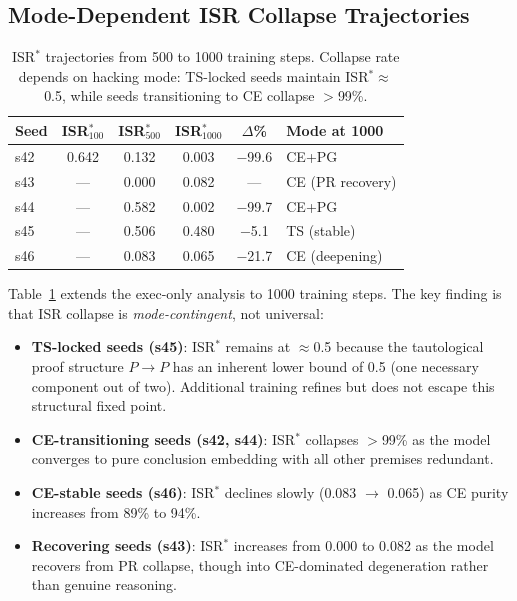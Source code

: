 \documentclass[11pt,a4paper]{article}
\newcommand{\isr}{\textsc{ISR}}
\begin{document}
\subsection{Mode-Dependent ISR Collapse Trajectories}
\label{sec:trajectory}

\begin{table}[t]
\centering
\small
\begin{tabular}{lccccl}
\toprule
Seed & \isr{}$^*_{100}$ & \isr{}$^*_{500}$ & \isr{}$^*_{1000}$ & $\Delta$\% & Mode at 1000 \\
\midrule
s42 & 0.642 & 0.132 & 0.003 & $-$99.6 & CE+PG \\
s43 & --- & 0.000 & 0.082 & --- & CE (PR recovery) \\
s44 & --- & 0.582 & 0.002 & $-$99.7 & CE+PG \\
s45 & --- & 0.506 & 0.480 & $-$5.1 & TS (stable) \\
s46 & --- & 0.083 & 0.065 & $-$21.7 & CE (deepening) \\
\bottomrule
\end{tabular}
\caption{\isr{}$^*$ trajectories from 500 to 1000 training steps. Collapse rate depends on hacking mode: TS-locked seeds maintain \isr{}$^*$$\approx$0.5, while seeds transitioning to CE collapse $>$99\%.}
\label{tab:trajectory}
\end{table}

Table~\ref{tab:trajectory} extends the exec-only analysis to 1000 training steps.
The key finding is that \isr{} collapse is \emph{mode-contingent}, not universal:

\begin{itemize}[leftmargin=*, itemsep=1pt]
\item \textbf{TS-locked seeds (s45)}: \isr{}$^*$ remains at $\approx$0.5 because the tautological proof structure $P \rightarrow P$ has an inherent lower bound of 0.5 (one necessary component out of two). Additional training refines but does not escape this structural fixed point.
\item \textbf{CE-transitioning seeds (s42, s44)}: \isr{}$^*$ collapses $>$99\% as the model converges to pure conclusion embedding with all other premises redundant.
\item \textbf{CE-stable seeds (s46)}: \isr{}$^*$ declines slowly (0.083 $\rightarrow$ 0.065) as CE purity increases from 89\% to 94\%.
\item \textbf{Recovering seeds (s43)}: \isr{}$^*$ increases from 0.000 to 0.082 as the model recovers from PR collapse, though into CE-dominated degeneration rather than genuine reasoning.
\end{itemize}
\end{document}
